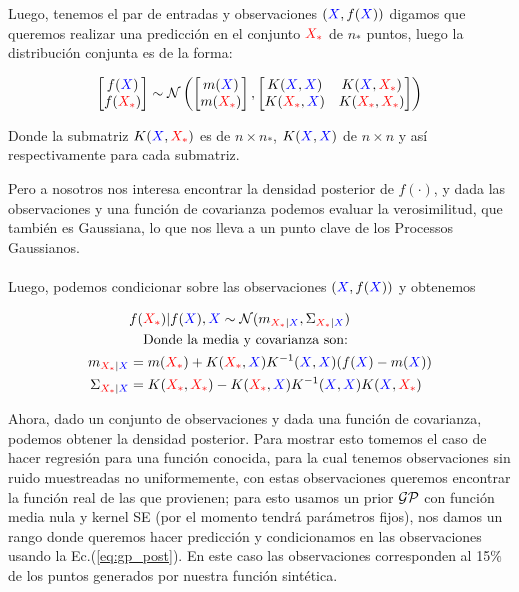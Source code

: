 Luego, tenemos el par de entradas y observaciones $\left(\textcolor{blue}{X}, f(\textcolor{blue}{X})\right)$ digamos que queremos realizar una predicción en el conjunto $\textcolor{red}{X_*}$ de $n_*$ puntos, luego la distribución conjunta es de la forma:

\begin{align}
	\begin{bmatrix} f(\textcolor{blue}{X}) \\ f(\textcolor{red}{X_*})  \end{bmatrix}
	\sim \mathcal{N} \left(
	\begin{bmatrix} m(\textcolor{blue}{X}) \\ m(\textcolor{red}{X_*})  \end{bmatrix}, 
	\begin{bmatrix}
		K(\textcolor{blue}{X}, \textcolor{blue}{X}) & K(\textcolor{blue}{X}, \textcolor{red}{X_*}) \\ K(\textcolor{red}{X_*}, \textcolor{blue}{X}) & K(\textcolor{red}{X_*}, \textcolor{red}{X_*})
	\end{bmatrix}
	 \right)
\end{align}

Donde la submatriz $K(\textcolor{blue}{X}, \textcolor{red}{X_*})$ es de $n \times n_*$, $K(\textcolor{blue}{X}, \textcolor{blue}{X})$ de $n \times n$ y así respectivamente para cada submatriz.

Pero a nosotros nos interesa encontrar la densidad posterior de $f(\cdot)$, y dada las observaciones y una función de covarianza podemos evaluar la verosimilitud, que también es Gaussiana, lo que nos lleva a un punto clave de los Processos Gaussianos.\\

\\

Luego, podemos condicionar sobre las observaciones $(\textcolor{blue}{X}, f(\textcolor{blue}{X}))$ y obtenemos

\begin{align}
	& f(\textcolor{red}{X_*})|f(\textcolor{blue}{X}), \textcolor{blue}{X}  \sim \mathcal{N}(m_{\textcolor{red}{X_*}|\textcolor{blue}{X}}, \Sigma_{\textcolor{red}{X_*}|\textcolor{blue}{X}})\\ \label{eq:gp_post}
	& \quad \text{Donde la media y covarianza son:} \nonumber \\
	m_{\textcolor{red}{X_*}|\textcolor{blue}{X}} & = m(\textcolor{red}{X_*}) + K(\textcolor{red}{X_*}, \textcolor{blue}{X})K^{-1}(\textcolor{blue}{X}, \textcolor{blue}{X}) (f(\textcolor{blue}{X}) - m(\textcolor{blue}{X}))\\
	 \Sigma_{\textcolor{red}{X_*}|\textcolor{blue}{X}} & = K(\textcolor{red}{X_*}, \textcolor{red}{X_*}) - K(\textcolor{red}{X_*}, \textcolor{blue}{X})K^{-1}(\textcolor{blue}{X}, \textcolor{blue}{X}) K(\textcolor{blue}{X}, \textcolor{red}{X_*})
\end{align}


Ahora, dado un conjunto de observaciones y dada una función de covarianza, podemos obtener la densidad posterior. Para mostrar esto tomemos el caso de hacer regresión para una función conocida, para la cual tenemos observaciones sin ruido muestreadas no uniformemente, con estas observaciones queremos encontrar la función real de las que provienen; para esto usamos un prior $\mathcal{GP}$ con función media nula y kernel SE (por el momento tendrá parámetros fijos), nos damos un rango donde queremos hacer predicción y condicionamos en las observaciones usando la Ec.(\ref{eq:gp_post}). En este caso las observaciones corresponden al 15$\%$ de los puntos generados por nuestra función sintética.\\

